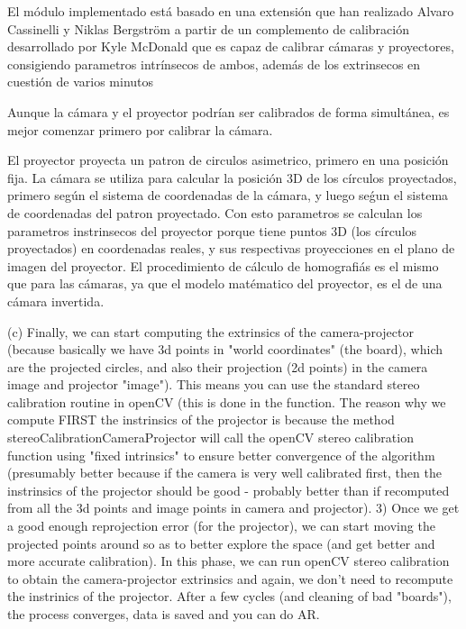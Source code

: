 El módulo implementado está basado en una extensión que han realizado Alvaro Cassinelli y Niklas Bergström a partir de un complemento de calibración desarrollado por Kyle McDonald que es capaz de calibrar cámaras y proyectores, consigiendo parametros intrínsecos de ambos, además de los extrinsecos en cuestión de varios minutos 


Aunque la cámara y el proyector podrían ser calibrados de forma simultánea, es mejor comenzar primero por calibrar la cámara.

El proyector proyecta un patron de circulos asimetrico, primero en una posición fija. La cámara se utiliza para calcular la posición 3D de los círculos proyectados, primero según el sistema de coordenadas de la cámara, y luego seǵun el sistema de coordenadas del patron proyectado. Con esto parametros se calculan los parametros instrinsecos del proyector porque tiene puntos 3D (los círculos proyectados) en coordenadas reales, y sus respectivas proyecciones en el plano de imagen del proyector. El procedimiento de cálculo de homografiás es el mismo que para las cámaras, ya que el modelo matématico del proyector, es el de una cámara invertida. 


(c) Finally, we can start computing the extrinsics of the camera-projector (because basically we have 3d points in "world coordinates" (the board), which are the projected circles, and also their projection (2d points) in the camera image and projector "image"). This means you can use the standard stereo calibration routine in openCV (this is done in the function. The reason why we compute FIRST the instrinsics of the projector is because the method stereoCalibrationCameraProjector will call the openCV stereo calibration function using "fixed intrinsics" to ensure better convergence of the algorithm (presumably better because if the camera is very well calibrated first, then the instrinsics of the projector should be good - probably better than if recomputed from all the 3d points and image points in camera and projector). 
3) Once we get a good enough reprojection error (for the projector), we can start moving the projected points around so as to better explore the space (and get better and more accurate calibration). In this phase, we can run openCV stereo calibration to obtain the camera-projector extrinsics and again, we don't need to recompute the instrinics of the projector. After a few cycles (and cleaning of bad "boards"), the process converges, data is saved and you can do AR. 




